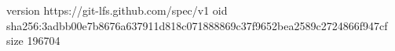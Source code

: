 version https://git-lfs.github.com/spec/v1
oid sha256:3adbb00e7b8676a637911d818c071888869c37f9652bea2589c2724866f947cf
size 196704
